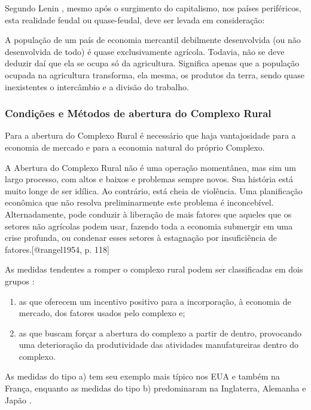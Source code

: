 \documentclass[
	12pt,				%
	oneside,			%
	a4paper,			%
	chapter=TITLE,		%
	section=TITLE,		%
	english,			%
	brazil				%
	]{abntex2}
\begin{document}
Segundo Lenin \autocite[\emph{apud}][99]{rangel1954}, mesmo após o
surgimento do capitalismo, nos países periféricos, esta realidade feudal
ou quase-feudal, deve ser levada em consideração:
\begin{citacao} 
A população de um país de economia mercantil debilmente desenvolvida (ou não 
desenvolvida de todo) é quase exclusivamente agrícola. Todavia, não se deve 
deduzir daí que ela se ocupa só da agricultura. Significa apenas que a população 
ocupada na agricultura transforma, ela mesma, os produtos da terra, sendo quase 
inexistentes o intercâmbio e a divisão do trabalho. 
\end{citacao}
\subsubsection{Condições e Métodos de abertura do Complexo
Rural}\label{condiuxe7uxf5es-e-muxe9todos-de-abertura-do-complexo-rural}

Para a abertura do Complexo Rural é necessário que haja vantajosidade
para a economia de mercado e para a economia natural do próprio
Complexo.
\begin{citacao} 
A Abertura do Complexo Rural não é uma operação momentânea, mas sim um largo
processo, com altos e baixos e problemas sempre novos. Sua história está muito
longe de ser idílica. Ao contrário, está cheia de violência. Uma planificação
econômica que não resolva preliminarmente este problema é inconcebível.
Alternadamente, pode conduzir à liberação de mais fatores que aqueles que os
setores não agrícolas podem usar, fazendo toda a economia submergir em uma crise
profunda, ou condenar esses setores à estagnação por insuficiência de
fatores.[@rangel1954, p. 118]
\end{citacao}
As medidas tendentes a romper o complexo rural podem ser classificadas
em dois grupos \autocite[113]{rangel1954}:
\begin{enumerate}
\def\labelenumi{\alph{enumi}.}
\item
  as que oferecem um incentivo positivo para a incorporação, à economia
  de mercado, dos fatores usados pelo complexo e;
\item
  as que buscam forçar a abertura do complexo a partir de dentro,
  provocando uma deterioração da produtividade das atividades
  manufatureiras dentro do complexo.
\end{enumerate}
As medidas do tipo a) tem seu exemplo mais típico nos EUA e também na
França, enquanto as medidas do tipo b) predominaram na Inglaterra,
Alemanha e Japão \autocite[114-115]{rangel1954}.
\end{document}
